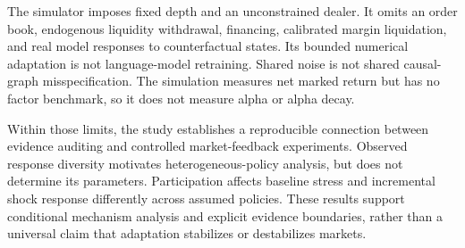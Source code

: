 The simulator imposes fixed depth and an unconstrained dealer. It omits an order book, endogenous liquidity withdrawal, financing, calibrated margin liquidation, and real model responses to counterfactual states. Its bounded numerical adaptation is not language-model retraining. Shared noise is not shared causal-graph misspecification. The simulation measures net marked return but has no factor benchmark, so it does not measure alpha or alpha decay.

Within those limits, the study establishes a reproducible connection between evidence auditing and controlled market-feedback experiments. Observed response diversity motivates heterogeneous-policy analysis, but does not determine its parameters. Participation affects baseline stress and incremental shock response differently across assumed policies. These results support conditional mechanism analysis and explicit evidence boundaries, rather than a universal claim that adaptation stabilizes or destabilizes markets.
